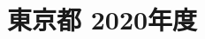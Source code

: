 \documentclass[../../hsm_tok_q.tex]{subfiles}
\begin{document}
    \section{東京都 2020年度}
    \subsection{　}
    
    \newpage
    \subsection{　}
    
    \newpage
    \subsection{　}
    
    \newpage
    \subsection{　}
    
    \newpage
    \subsection{　}
    
\end{document}
